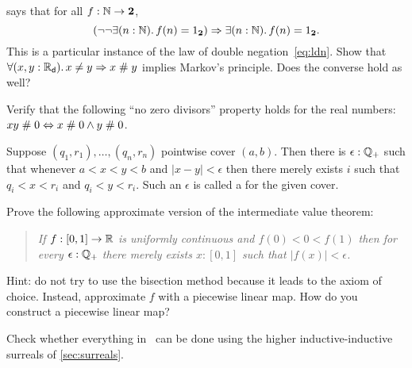 %

\begin{ex} \label{ex:reals-apart-neq-MP}
  says that for all $f : \mathbb{N} \to \mathbf{2}$,
  \begin{equation*}
    (\lnot \lnot \exis{n : \nat} f(n) = \btrue)
    \Rightarrow
    \exis{n : \nat} f(n) = \btrue.
  \end{equation*}
  This is a particular instance of the law of double negation~\eqref{eq:ldn}. Show that
  $\fall{x, y: \RD} x \neq y \Rightarrow x \apart y$ implies Markov's principle. Does the
  converse hold as well?
\end{ex}

\begin{ex} \label{ex:reals-apart-zero-divisors}
  Verify that the following ``no zero divisors'' property holds for the real numbers:
  $x y \mathrel{\#} 0 \Leftrightarrow x \mathrel{\#} 0 \land y \mathrel{\#} 0$.
\end{ex}

\begin{ex} \label{ex:finite-cover-lebesgue-number}
  Suppose $(q_1, r_1), \ldots, (q_n, r_n)$ pointwise cover $(a, b)$. Then there is
  $\epsilon : \mathbb{Q}_{+}$ such that whenever $a < x < y < b$ and $|x - y| < \epsilon$
  then there merely exists $i$ such that $q_i < x < r_i$ and $q_i < y < r_i$. Such an
  $\epsilon$ is called a 
  for the given cover.
\end{ex}

\begin{ex} \label{ex:mean-value-theorem}
  Prove the following approximate version of the intermediate value theorem:
  \begin{quote}
    \emph{
      If $f : [0,1] \to \mathbb{R}$ is uniformly continuous and $f(0) < 0 < f(1)$ then
      for every $\epsilon : \mathbb{Q}_{+}$ there merely exists $x : [0,1]$ such that $|f(x)| <
      \epsilon$.
    }
  \end{quote}
  Hint: do not try to use the bisection method because it leads to the axiom of choice.
  Instead, approximate $f$ with a piecewise linear map. How do you construct a piecewise
  linear map?
\end{ex}

\begin{ex}
  Check whether everything in~\cite{knuth74:_surreal_number} can be done using the higher
  inductive-inductive surreals of \autoref{sec:surreals}.
\end{ex}

%


